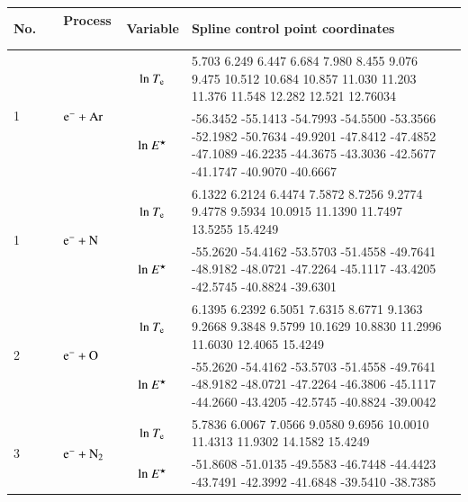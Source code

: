 \begin{table}[!htbp]
  \center{}
  \begin{threeparttable}
    \label{tab:spline_tab}
    \begin{tabular*}{1.1\textwidth}{l@{\extracolsep{\fill}}lcll}
    \toprule
   No.~~ & Process ~& Variable & Spline control point coordinates  \\
        \midrule

    \multirow{2}{*}{1} &  \multirow{2}{*}{ $\rm e^- + Ar  $   } & ${\rm ln}~T_{\rm e}$  & \tiny       5.703
    6.249
    6.447
    6.684
    7.980
    8.455
    9.076
    9.475
    10.512
    10.684
    10.857
    11.030
    11.203
    11.376
    11.548
    12.282
    12.521
    12.76034\\
  &  & ${\rm ln}~E^\star$     & \tiny     -56.3452
    -55.1413
    -54.7993
    -54.5500
    -53.3566
    -52.1982
    -50.7634
    -49.9201
    -47.8412
    -47.4852
    -47.1089
    -46.2235
    -44.3675
    -43.3036
    -42.5677
    -41.1747
    -40.9070
    -40.6667\\     
  \midrule        

  \multirow{2}{*}{1} &  \multirow{2}{*}{ $\rm e^- + N  $   } & ${\rm ln}~T_{\rm e}$  & \tiny      6.1322    6.2124    6.4474    7.5872    8.7256    9.2774    9.4778    9.5934   10.0915   11.1390   11.7497   13.5255   15.4249
 \\
  &  & ${\rm ln}~E^\star$     & \tiny -55.2620  -54.4162  -53.5703  -51.4558  -49.7641  -48.9182  -48.0721  -47.2264  -45.1117  -43.4205  -42.5745  -40.8824  -39.6301\\     
  \midrule  
      
  \multirow{2}{*}{2} &  \multirow{2}{*}{ $\rm e^- + O  $   } & ${\rm ln}~T_{\rm e}$  & \tiny    6.1395    6.2392    6.5051    7.6315    8.6771    9.1363    9.2668    9.3848    9.5799   10.1629   10.8830   11.2996   11.6030   12.4065   15.4249 \\
  &  & ${\rm ln}~E^\star$     & \tiny  -55.2620  -54.4162  -53.5703  -51.4558  -49.7641  -48.9182  -48.0721  -47.2264  -46.3806  -45.1117  -44.2660  -43.4205  -42.5745  -40.8824  -39.0042\\     
  \midrule    
  
  \multirow{2}{*}{3} &  \multirow{2}{*}{ $\rm e^- + N_2 $   } & ${\rm ln}~T_{\rm e}$  & \tiny          5.7836    6.0067    7.0566    9.0580    9.6956   10.0010   11.4313   11.9302   14.1582   15.4249
\\
  &  & ${\rm ln}~E^\star$     & \tiny       -51.8608  -51.0135  -49.5583  -46.7448  -44.4423  -43.7491  -42.3992  -41.6848  -39.5410  -38.7385
\\
  \midrule  
  

\end{tabular*}
\end{threeparttable}
\end{table}
